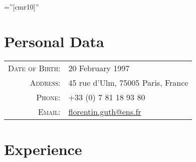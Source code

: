 \documentclass[a4paper,10pt]{article} %
\begin{document}
\pagestyle{empty} %

\font\fb=''[cmr10]'' %


\par{\bigskip\par} %

\section{Personal Data}

\begin{tabular}{rl}
\textsc{Date of Birth:} & 20 February 1997 \\
\textsc{Address:} & 45 rue d'Ulm, 75005 Paris, France \\
\textsc{Phone:} & +33 (0) 7 81 18 93 80\\
\textsc{Email:} & \href{mailto:florentin.guth@ens.fr}{florentin.guth@ens.fr}
\end{tabular}


\section{Experience}
\end{document}
